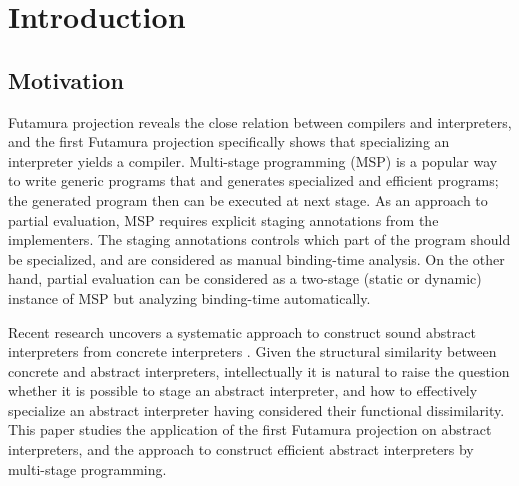 \section{Introduction}

\subsection{Motivation}

Futamura projection \cite{Futamura1999, futamura1971partial} reveals the close relation between 
compilers and interpreters, 
and the first Futamura projection specifically shows that specializing an interpreter yields a compiler. 
Multi-stage programming (MSP) \cite{taha1999multi, DBLP:conf/pepm/TahaS97} is a popular way to write 
generic programs that and generates specialized and efficient programs; 
the generated program then can be executed at next stage. 
As an approach to partial evaluation, MSP requires explicit staging annotations from the implementers.
The staging annotations controls which part of the program should be specialized, and are considered 
as manual binding-time analysis. On the other hand, partial evaluation \cite{DBLP:books/daglib/0072559} 
can be considered as a two-stage (static or dynamic) instance of MSP but analyzing binding-time automatically.

Recent research uncovers a systematic approach to construct sound abstract interpreters 
from concrete interpreters \cite{DBLP:journals/jfp/HornM12, DBLP:conf/icfp/HornM10, DBLP:journals/pacmpl/DaraisLNH17}.
Given the structural similarity between concrete and abstract interpreters, intellectually 
it is natural to raise the question whether it is possible to stage an abstract interpreter, and how 
to effectively specialize an abstract interpreter having considered their functional dissimilarity. 
This paper studies the application of the first Futamura projection on abstract interpreters, 
and the approach to construct efficient abstract interpreters by multi-stage programming.

